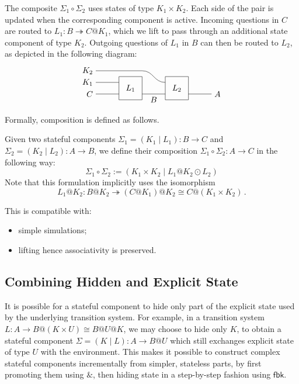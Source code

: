 \documentclass[acmsmall,screen,review,anonymous]{acmart}
\newcommand{\kw}[1]{\ensuremath{ \mathsf{#1} }}
\begin{document}
The composite $\Sigma_1 \circ \Sigma_2$
uses states of type $K_1 \times K_2$.
Each side of the pair is updated
when the corresponding component is active.
Incoming questions in $C$ are routed to $L_1 : B \twoheadrightarrow C@K_1$,
which we lift to pass through an additional state component of type $K_2$.
Outgoing questions of $L_1$ in $B$ can then be routed to $L_2$,
as depicted in the following diagram:
\[
  \begin{tikzpicture}[yscale=0.5]
    \draw (0,2) node[left] {$K_2$} -- (2,2) .. controls +(0.5,0) and +(-0.5,0) .. (3,1);
    \draw (0,1) node[left] {$K_1$} -- (1,1);
    \draw (0,0) node[left] {$C$} -- (1,0);
    \draw (2,0) -- node[below] {$B$} (3,0);
    \draw (4,0) -- (5,0) node[right] {$A$};
    \draw (1,1.5) rectangle node {$L_1$} (2,-0.5);
    \draw (3,1.5) rectangle node {$L_2$} (4,-0.5);
  \end{tikzpicture}
\]
Formally,
composition is defined as follows.

\begin{definition}[Composition] \label{def:slcomp}
Given two stateful components
$\Sigma_1 = (K_1 \mid L_1) : B \rightarrow C$ and
$\Sigma_2 = (K_2 \mid L_2) : A \rightarrow B$,
we define their composition
$\Sigma_1 \circ \Sigma_2 : A \rightarrow C$
in the following way:
\[
  \Sigma_1 \circ \Sigma_2 :=
    ( K_1 \times K_2 \mid L_1@K_2 \odot L_2 )
\]
Note that this formulation
implicitly uses the isomorphism
\[
  L_1@K_2 : B@K_2 \twoheadrightarrow (C@K_1)@K_2 \cong C@(K_1 \times K_2)
  \,.
\]
\end{definition}




\begin{lemma}
  This is compatible with:
  \begin{itemize}
    \item simple simulations;
    \item lifting hence associativity is preserved.
  \end{itemize}

\end{lemma}


\subsection{Combining Hidden and Explicit State} %

It is possible for a stateful component
to hide only part of the explicit state
used by the underlying transition system.
For example,
in a transition system
$L : A \rightarrow B@(K \times U) \cong B@U@K$,
we may choose to hide only $K$,
to obtain a stateful component
$\Sigma = (K \mid L) : A \rightarrow B@U$
which still exchanges explicit state of type $U$
with the environment.
This makes it possible to construct
complex stateful components incrementally
from simpler, stateless parts,
by first promoting them using $\&$,
then hiding state in a step-by-step fashion
using $\kw{fbk}$.
\end{document}
